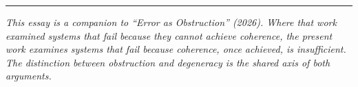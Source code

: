 \documentclass[12pt, oneside]{article}
\theoremstyle{definition}
\begin{document}
\vspace{2em}
\begin{center}
\rule{0.4\linewidth}{0.3pt}
\end{center}
\vspace{0.5em}

\noindent\textit{This essay is a companion to ``Error as Obstruction'' (2026). Where that work examined systems that fail because they cannot achieve coherence, the present work examines systems that fail because coherence, once achieved, is insufficient. The distinction between obstruction and degeneracy is the shared axis of both arguments.}
\end{document}
